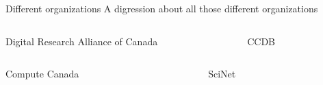 \documentclass[
  10pt,
  ignorenonframetext,
  aspectratio=169]{beamer}
\begin{document}
\begin{frame}{Different organizations}
\label{different-organizations}
A digression about all those different organizations

\begin{columns}[T]
\begin{column}{0.47\linewidth}\setlength{\parskip}{0.5\baselineskip}
\begin{block}{Digital Research Alliance of Canada}\setlength{\parskip}{0.5\baselineskip}
\label{digital-research-alliance-of-canada}
\end{block}
\end{column}

\begin{column}{0.47\linewidth}\setlength{\parskip}{0.5\baselineskip}
\begin{block}{CCDB}\setlength{\parskip}{0.5\baselineskip}
\label{ccdb}
\end{block}
\end{column}
\end{columns}

\begin{columns}[T]
\begin{column}{0.47\linewidth}\setlength{\parskip}{0.5\baselineskip}
\begin{block}{Compute Canada}\setlength{\parskip}{0.5\baselineskip}
\label{compute-canada}
\end{block}
\end{column}

\begin{column}{0.47\linewidth}\setlength{\parskip}{0.5\baselineskip}
\begin{block}{SciNet}\setlength{\parskip}{0.5\baselineskip}
\label{scinet}
\end{block}
\end{column}
\end{columns}
\end{frame}
\end{document}
